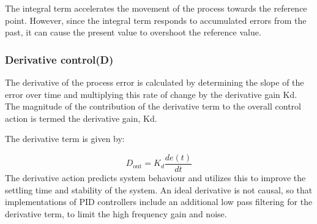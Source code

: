 The integral term accelerates the movement of the process towards the reference point.
However, since the integral term responds to accumulated errors from the past, it can cause the present value to overshoot the reference value.
\subsubsection {Derivative control(D)} 
The derivative of the process error is calculated by determining the slope of the error over time and multiplying this rate of change by the derivative gain Kd. The magnitude of the contribution of the derivative term to the overall control action is termed the derivative gain, Kd.

The derivative term is given by:

$$D_{\mathrm{out}}=K_d\frac{de(t)}{dt}$$
The derivative action predicts system behaviour and utilizes this to improve the settling time and stability of the system.
An ideal derivative is not causal, so that implementations of PID controllers include an additional low pass filtering for the derivative term, to limit the high frequency gain and noise.


